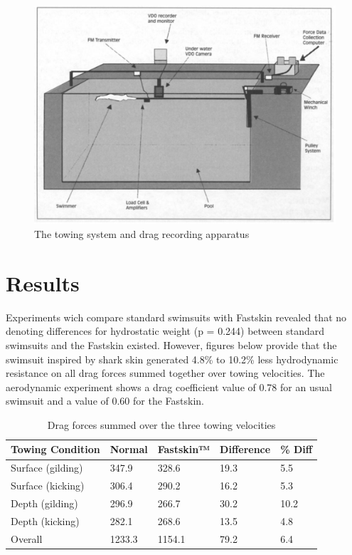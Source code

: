 \documentclass[twoside,twocolumn]{article}                          %
\begin{document}
\begin{figure}[!h]
\begin{center}
  \includegraphics[scale=0.3]{fig2.JPG}
\end{center}
\caption{The towing system and drag recording apparatus}
\end{figure}

\section{Results}
Experiments wich compare standard swimsuits with Fastskin revealed that no denoting differences for hydrostatic weight (p = 0.244) between standard swimsuits and the Fastskin existed. However, figures below provide that the swimsuit inspired by shark skin generated 4.8\% to 10.2\% less hydrodynamic resistance on all drag forces summed together over towing velocities. The aerodynamic experiment shows a drag coefficient value of 0.78 for an usual swimsuit and a value of 0.60 for the Fastskin. 

\begin{center}
\begin{table}[!h]
  \begin{tabular}{ m{35px} m{35px} m{35px} m{35px} m{35px} }
    
    \hline
    Towing Condition & Normal & Fastskin™ & Difference & \% Diff
    \tabularnewline

    \hline
    Surface (gilding) & 347.9 & 328.6 & 19.3 & 5.5
    \tabularnewline

    \hline
    Surface (kicking) & 306.4 & 290.2 & 16.2 & 5.3
    \tabularnewline

    \hline
    Depth (gilding) & 296.9 & 266.7 & 30.2 & 10.2
    \tabularnewline

    \hline
    Depth (kicking) & 282.1 & 268.6 & 13.5 & 4.8
    \tabularnewline

    \hline
    Overall & 1233.3 & 1154.1 & 79.2 & 6.4
    \tabularnewline
    \hline
  \end{tabular}
  \caption{ Drag forces summed over the three towing velocities}
  \vspace{-8mm}
\end{table}
\end{center}
\end{document}
